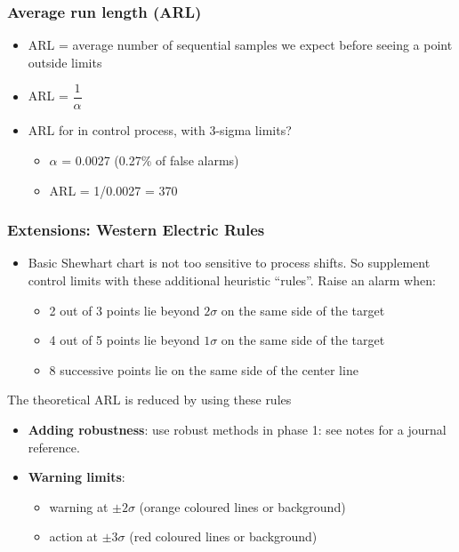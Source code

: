 \begin{frame}\frametitle{Average run length (ARL)}
	\begin{itemize}
		\item	ARL = average number of sequential samples we expect before seeing a point outside limits
		\item	ARL = $\dfrac{1}{\alpha}$
		\item	ARL for in control process, with 3-sigma limits?
		\begin{itemize}
			\item	$\alpha$ = 0.0027 (0.27\% of false alarms)
			\item	ARL = 1/0.0027 = 370
		\end{itemize}
	\end{itemize}
\end{frame}

\begin{frame}\frametitle{Extensions: Western Electric Rules}
	\begin{itemize}
		\item	Basic Shewhart chart is not too sensitive to process shifts. So supplement control limits with these additional heuristic ``rules''. Raise an alarm when:
		\begin{itemize}
			\item	2 out of 3 points lie beyond $2\sigma$ on the same side of the target
			\item	4 out of 5 points lie beyond $1\sigma$ on the same side of the target
			\item	8 successive points lie on the same side of the center line
		\end{itemize}
	\end{itemize}
	
	\vspace{12pt}
	The theoretical ARL is reduced by using these rules
	\begin{itemize}
		\item	\textbf{Adding robustness}: use robust methods in phase 1: see notes for a journal reference.
	\end{itemize}
	
	\vspace{12pt}
	\begin{itemize}
		\item	\textbf{Warning limits}:
		\begin{itemize}
			\item	warning at $\pm 2 \sigma$ (orange coloured lines or background)
			\item	action at $\pm 3\sigma$ (red coloured lines or background)
		\end{itemize}
	\end{itemize}
\end{frame}


